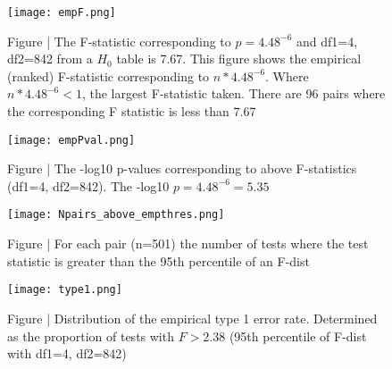\documentclass[paper=a4, fontsize=11pt]{scrartcl}         %
\numberwithin{equation}{section}                  %
\numberwithin{figure}{section}                    %
\numberwithin{table}{section}                   %
\begin{document}
\newpage

\begin{figure}[H]
\centering
\texttt{[image: empF.png]}
\caption*{Figure | The F-statistic corresponding to $p=4.48^{-6}$ and df1=4, df2=842 from a $H_0$ table is 7.67. This figure shows the empirical (ranked) F-statistic corresponding to $n * 4.48^{-6}$. Where $n * 4.48^{-6} < 1$, the largest F-statistic taken. There are 96 pairs where the corresponding F statistic is less than 7.67}
\end{figure}


\begin{figure}[H]
\centering
\texttt{[image: empPval.png]}
\caption*{Figure | The -log10 p-values corresponding to above F-statistics (df1=4, df2=842). The -log10 $p=4.48^{-6} = 5.35$}
\end{figure}



\newpage

\begin{figure}[H]
\centering
\texttt{[image: Npairs\_above\_empthres.png]}
\caption*{Figure | For each pair (n=501) the number of tests where the test statistic is greater than the 95th percentile of an F-dist}
\end{figure}


\begin{figure}[H]
\centering
\texttt{[image: type1.png]}
\caption*{Figure | Distribution of the empirical type 1 error rate. Determined as the proportion of tests with $F > 2.38$ (95th percentile of F-dist with df1=4, df2=842)}
\end{figure}



\newpage
\end{document}
